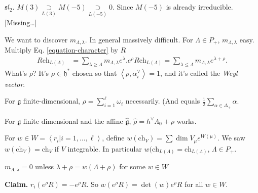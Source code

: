 \begin{example}
\label{example-sl2-characters}
$\mathfrak{sl}_2$.
$M(3)\underset{L(3)}{\supset}M(-5)
\underset{L(-5)}{\supset}0$. Since $M(-5)$ is
already irreducible.
[Missing…]
\end{example}

We want to discover $m_{\Lambda,\lambda}$.
In general massively difficult.
For $\Lambda \in P_+$, $m_{\Lambda,\lambda}$
easy.
Multiply Eq. \ref{equation-character} by  $R$
$$
\begin{aligned}
R\text{ch}_{L(\Lambda)}&=\sum_{\lambda \geq
\Lambda} m_{\Lambda,\lambda}
e^{\lambda}.
e^{\rho}R\text{ch}_{L(\Lambda)}=\sum_{\lambda
\leq  \Lambda}
m_{\Lambda,\lambda}e^{\lambda+\rho}.
\end{aligned}
$$
What's $\rho$? It's $\rho \in \mathfrak{h}^*$
chosen so that
$\left\langle{}\rho,\alpha_i^\vee\right\rangle{}=1$, and it's
called
the {\it Weyl vector}.

\begin{remark}
\label{remark-finite-dimension}
For $\mathfrak{g}$ finite-dimensional,
$\rho=\sum_{i=1}^\ell \omega_i$
necessarily. (And equals
$\frac{1}{2}\sum_{\alpha \in
\Delta_+}\alpha$.

For $\mathfrak{g}$ finite dimensional and the
affine $\hat{\mathfrak{g}}$,
$\hat{\rho}=h^\vee\Lambda_0+\rho$ works.
\end{remark}

For $w \in
W=\left\langle{}r_i|i=1,\ldots,\ell\right\rangle{}$,
define $w(\text{ch}_V)=\sum \dim V_\mu
e^{W(\mu)}$.
We saw $w(\text{ch}_V)=\text{ch}_V$ if $V$
integrable.
In particular
$w(\text{ch}_{L(\Lambda)}=\text{ch}
_{L(\Lambda)}$,
$\Lambda \in P_+$.

\begin{lemma}
\label{lemma-for-Weyl-formula}
$m_{\Lambda,\lambda}=0$ unless
$\lambda+\rho=w(\Lambda+\rho)$ for some $w
\in W$
\end{lemma}

\medskip\noindent
{\bf Claim.} $r_i(e^{\rho} R)=-e^\rho R$.
So $w(e^\rho R)=\det(w)e^\rho R$ for all $w
\in W$.

